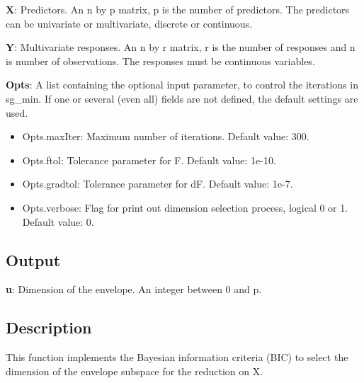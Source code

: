 \documentclass[a4paper,11pt,openany]{memoir}
\begin{document}
\begin{par}
\textbf{X}: Predictors. An n by p matrix, p is the number of predictors. The predictors can be univariate or multivariate, discrete or continuous.
\end{par} \vspace{1em}
\begin{par}
\textbf{Y}: Multivariate responses. An n by r matrix, r is the number of responses and n is number of observations. The responses must be continuous variables.
\end{par} \vspace{1em}
\begin{par}
\textbf{Opts}: A list containing the optional input parameter, to control the iterations in sg\_min. If one or several (even all) fields are not defined, the default settings are used.
\end{par} \vspace{1em}
\begin{itemize}
\setlength{\itemsep}{-1ex}
   \item Opts.maxIter: Maximum number of iterations.  Default value: 300.
   \item Opts.ftol: Tolerance parameter for F.  Default value: 1e-10.
   \item Opts.gradtol: Tolerance parameter for dF.  Default value: 1e-7.
   \item Opts.verbose: Flag for print out dimension selection process, logical 0 or 1. Default value: 0.
\end{itemize}


\subsection*{Output}

\begin{par}
\textbf{u}: Dimension of the envelope. An integer between 0 and p.
\end{par} \vspace{1em}


\subsection*{Description}

\begin{par}
This function implements the Bayesian information criteria (BIC) to select the dimension of the envelope subspace for the reduction on X.
\end{par} \vspace{1em}
\end{document}
